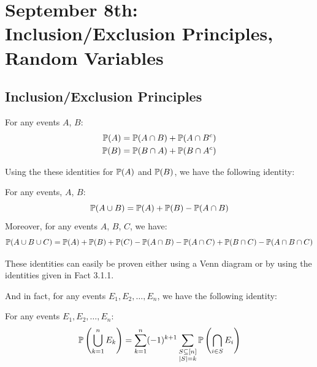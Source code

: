 \section{September 8th: Inclusion/Exclusion Principles, Random Variables}

\subsection{Inclusion/Exclusion Principles}

\begin{factbox}
   For any events $A$, $B$:
   \begin{align*}
      \mathbb{P}(A) = \mathbb{P}(A \cap B) + \mathbb{P}(A \cap B^c) \\
      \mathbb{P}(B) = \mathbb{P}(B \cap A) + \mathbb{P}(B \cap A^c) 
   \end{align*}
\end{factbox} 

Using the these identities for $\mathbb{P}(A)$ and $\mathbb{P}(B)$, we have the following identity:

\begin{factbox}
   For any events, $A$, $B$:
   \[ \mathbb{P}(A \cup B) = \mathbb{P}(A) + \mathbb{P}(B) - \mathbb{P}(A \cap B) \]
   Moreover, for any events $A$, $B$, $C$, we have:
   \[ \mathbb{P}(A \cup B \cup C) = \mathbb{P}(A) + \mathbb{P}(B) + \mathbb{P}(C) - \mathbb{P}(A \cap B) - \mathbb{P}(A \cap C) + \mathbb{P}(B \cap C) - \mathbb{P}(A \cap B \cap C) \]
\end{factbox}

These identities can easily be proven either using a Venn diagram or by using the identities given in Fact 3.1.1. 

And in fact, for any events $E_1, E_2, \dots, E_n$, we have the following identity:

\begin{propbox}
   For any events $E_1, E_2, \dots, E_n$:
   \[ \mathbb{P}\left(\bigcup_{k = 1}^n E_k\right) = \sum_{k = 1}^{n}(-1)^{k+1}\sum_{\substack{S \subseteq [n] \\ |S| = k}}\mathbb{P}\left(\bigcap_{i \in S}E_i\right) \]
\end{propbox}

